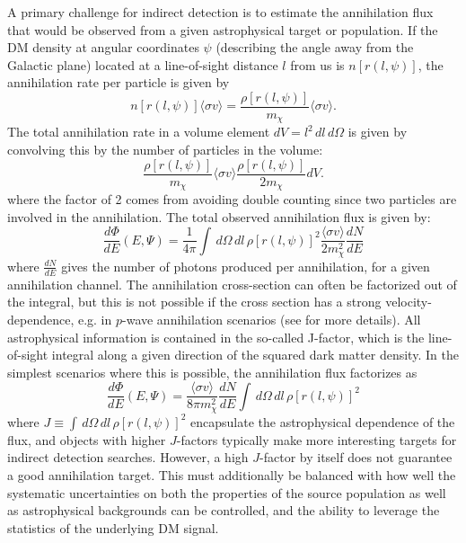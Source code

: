 A primary challenge for indirect detection is to estimate the annihilation flux that would be observed from a given astrophysical target or population. If the DM density at angular coordinates $\psi$ (describing the angle away from the Galactic plane) located at a line-of-sight distance $l$ from us is $n[r(l,\psi)]$, the annihilation rate per particle is given by
\begin{equation}
n[r(l,\psi)]\langle\sigma v\rangle = \frac{\rho[r(l,\psi)]}{m_\chi}\langle\sigma v\rangle.
\end{equation}
The total annihilation rate in a volume element $dV = l^2\,dl\,d\Omega$ is given by convolving this by the number of particles in the volume:
\begin{equation}
\frac{\rho[r(l,\psi)]}{m_\chi}\langle\sigma v\rangle \frac{\rho[r(l,\psi)]}{2m_\chi}dV.
\end{equation}
where the factor of 2 comes from avoiding double counting since two particles are involved in the annihilation. The total observed annihilation flux is given by:
\begin{equation}
\frac{d\Phi}{dE}(E,\Psi) = \frac{1}{4\pi}\int\,d\Omega\,dl\,\rho[r(l,\psi)]^2\frac{\langle\sigma v\rangle}{2m_\chi^2}\frac{dN}{dE}
\end{equation}
where $\frac{dN}{dE}$ gives the number of photons produced per annihilation, for a given annihilation channel. The annihilation cross-section can often be factorized out of the integral, but this is not possible if the cross section has a strong velocity-dependence, e.g. in $p$-wave annihilation scenarios (see for more details). All astrophysical information is contained in the so-called J-factor, which is the line-of-sight integral along a given direction of the squared dark matter density. In the simplest scenarios where this is possible, the annihilation flux factorizes as
\begin{equation}
\frac{d\Phi}{dE}(E,\Psi) = \frac{\langle\sigma v\rangle}{8\pi m_\chi^2}\frac{dN}{dE}\int\,d\Omega\,dl\,\rho[r(l,\psi)]^2
\end{equation}
where $J\equiv\int\,d\Omega\,dl\,\rho[r(l,\psi)]^2$ encapsulate the astrophysical dependence of the flux, and objects with higher $J$-factors typically make more interesting targets for indirect detection searches. However, a high $J$-factor by itself does not guarantee a good annihilation target. This must additionally be balanced with how well the systematic uncertainties on both the properties of the source population as well as astrophysical backgrounds can be controlled, and the ability to leverage the statistics of the underlying DM signal.

